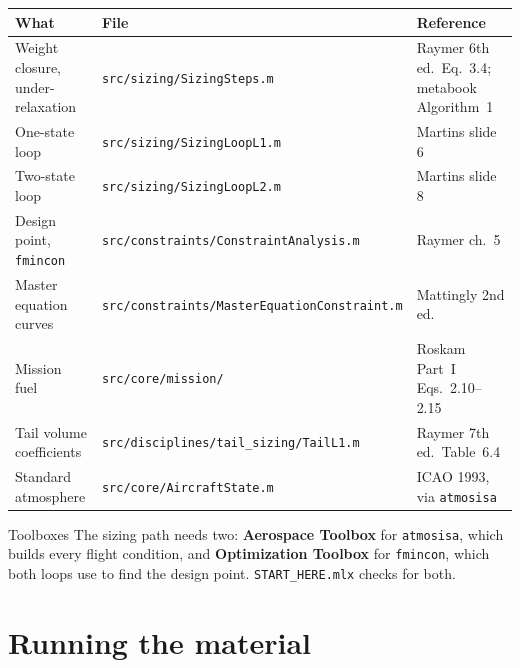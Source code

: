 \documentclass[11pt, a4paper]{article}
\begin{document}
\begin{center}
\footnotesize
\begin{tabular}{@{}p{42mm}p{54mm}p{50mm}@{}}
\toprule
\textbf{What} & \textbf{File} & \textbf{Reference} \\
\midrule
Weight closure, under-relaxation
  & \texttt{src/sizing/SizingSteps.m}
  & Raymer 6th ed.\ Eq.~3.4; metabook Algorithm~1 \\
One-state loop
  & \texttt{src/sizing/SizingLoopL1.m}
  & Martins slide 6 \\
Two-state loop
  & \texttt{src/sizing/SizingLoopL2.m}
  & Martins slide 8 \\
Design point, \texttt{fmincon}
  & \texttt{src/constraints/ConstraintAnalysis.m}
  & Raymer ch.~5 \\
Master equation curves
  & \texttt{src/constraints/MasterEquationConstraint.m}
  & Mattingly 2nd ed. \\
Mission fuel
  & \texttt{src/core/mission/}
  & Roskam Part~I Eqs.~2.10--2.15 \\
Tail volume coefficients
  & \texttt{src/disciplines/tail\_sizing/TailL1.m}
  & Raymer 7th ed.\ Table~6.4 \\
Standard atmosphere
  & \texttt{src/core/AircraftState.m}
  & ICAO 1993, via \texttt{atmosisa} \\
\bottomrule
\end{tabular}
\end{center}

\begin{keybox}{Toolboxes}
The sizing path needs two: \textbf{Aerospace Toolbox} for \texttt{atmosisa},
which builds every flight condition, and \textbf{Optimization Toolbox} for
\texttt{fmincon}, which both loops use to find the design point.
\texttt{START\_HERE.mlx} checks for both.
\end{keybox}

\section{Running the material}
\end{document}
